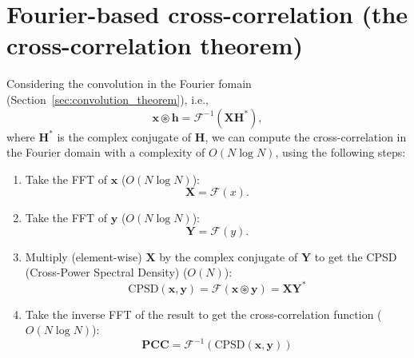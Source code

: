 

\section{Fourier-based cross-correlation (the cross-correlation theorem)}

Considering the convolution in the Fourier fomain (Section~\ref{sec:convolution_theorem}), i.e.,
\begin{equation}
  \mathbf{x}\circledast\mathbf{h} = \mathcal{F}^{-1}(\mathbf{X}\mathbf{H}^*),
  \label{eq:FFT_CC}
\end{equation}
where $\mathbf{H}^*$ is the complex conjugate of $\mathbf{H}$, we can
compute the cross-correlation in the Fourier domain with a complexity
of $O(N\log N)$, using the following steps:
\begin{enumerate}
\item Take the FFT of $\mathbf{x}$ ($O(N\log N)$):
  \begin{equation}
    \mathbf{X} = \mathcal{F}(x).
  \end{equation}
\item Take the FFT of $\mathbf{y}$ ($O(N\log N)$):
  \begin{equation}
    \mathbf{Y} = \mathcal{F}(y).
  \end{equation}
\item Multiply (element-wise) $\mathbf{X}$ by the complex conjugate of
  $\mathbf{Y}$ to get the CPSD (Cross-Power Spectral Density) ($O(N)$):
  \begin{equation}
    \text{CPSD}(\mathbf{x},\mathbf{y})=\mathcal{F}(\mathbf{x}\circledast\mathbf{y})=\mathbf{X}\mathbf{Y}^*
  \end{equation}
\item Take the inverse FFT of the result to get the cross-correlation
  function ($O(N\log N)$):
  \begin{equation}
    \mathbf{PCC} = \mathcal{F}^{-1}(\text{CPSD}(\mathbf{x},\mathbf{y}))
  \end{equation}
\end{enumerate}


